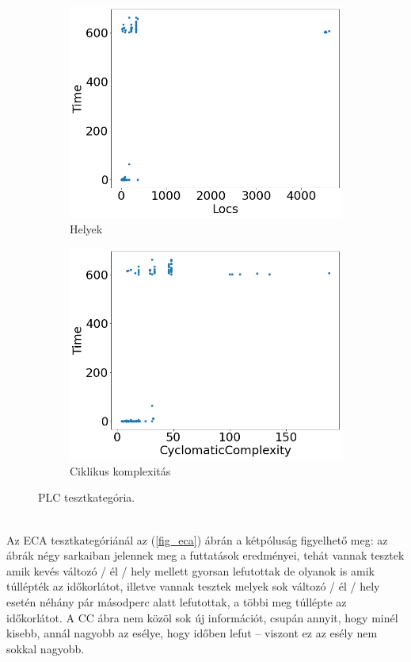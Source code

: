 \begin{figure}[ht]
\begin{subfigure}[b]{0.5\linewidth}
		\includegraphics[width=0.95\linewidth]{figures/plc/locs.png} 
		\caption{Helyek} 
	\end{subfigure}%
	\begin{subfigure}[b]{0.5\linewidth}
		\centering
		\includegraphics[width=0.95\linewidth]{figures/plc/cc.png}
		\caption{Ciklikus komplexitás}
	\end{subfigure}
	\caption{PLC tesztkategória.}
	\label{fig_plc}
\end{figure}
\ \\
Az ECA tesztkategóriánál az (\ref{fig_eca}) ábrán a kétpóluság figyelhető meg: az ábrák négy sarkaiban jelennek meg a futtatások eredményei, tehát vannak tesztek amik kevés változó / él / hely mellett gyorsan lefutottak de olyanok is amik túllépték az időkorlátot, illetve vannak tesztek melyek sok változó / él / hely esetén néhány pár másodperc alatt lefutottak, a többi meg túllépte az időkorlátot. A CC ábra nem közöl sok új információt, csupán annyit, hogy minél kisebb, annál nagyobb az esélye, hogy időben lefut -- viszont ez az esély nem sokkal nagyobb.

